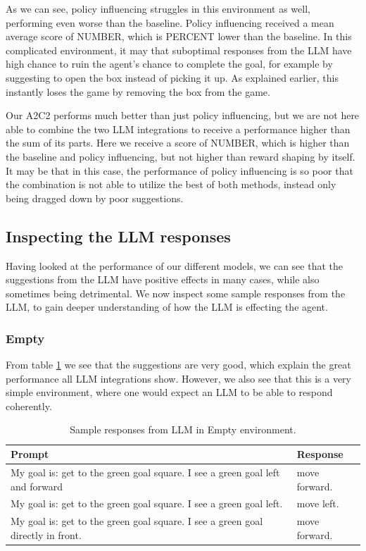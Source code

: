 \documentclass[conference]{IEEEtran}
\begin{document}
As we can see, policy influencing struggles in this environment as well, performing even worse than the baseline. Policy influencing received a mean average score of NUMBER, which is PERCENT lower than the baseline. In this complicated environment, it may that suboptimal responses from the LLM have high chance to ruin the agent's chance to complete the goal, for example by suggesting to open the box instead of picking it up. As explained earlier, this instantly loses the game by removing the box from the game.

Our A2C2 performs much better than just policy influencing, but we are not here able to combine the two LLM integrations to receive a performance higher than the sum of its parts. Here we receive a score of NUMBER, which is higher than the baseline and policy influencing, but not higher than reward shaping by itself. It may be that in this case, the performance of policy influencing is so poor that the combination is not able to utilize the best of both methods, instead only being dragged down by poor suggestions.

\subsection{Inspecting the LLM responses}

Having looked at the performance of our different models, we can see that the suggestions from the LLM have positive effects in many cases, while also sometimes being detrimental. We now inspect some sample responses from the LLM, to gain deeper understanding of how the LLM is effecting the agent.

\subsubsection{Empty}

From table \ref{emptyresponses} we see that the suggestions are very good, which explain the great performance all LLM integrations show. However, we also see that this is a very simple environment, where one would expect an LLM to be able to respond coherently.

\begin{table}[h]
\caption{Sample responses from LLM in Empty environment.}
\begin{center}
\label{emptyresponses}
\begin{tabularx}{3.25in}{X | X}
Prompt & Response \\
\hline
My goal is: get to the green goal square. I see a green goal left and forward & move forward. \\
My goal is: get to the green goal square. I see a green goal left. & move left. \\
My goal is: get to the green goal square. I see a green goal directly in front. & move forward.
\end{tabularx}
\end{center}
\end{table}
\end{document}
